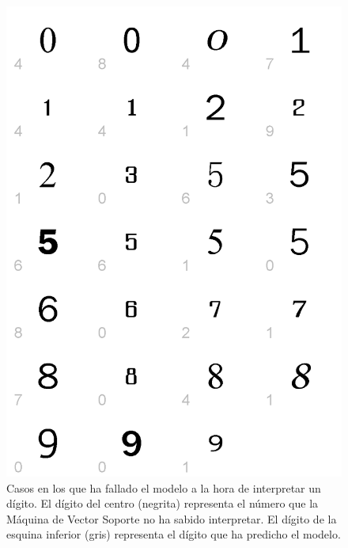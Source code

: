 \documentclass[12pt,spanish,a4paper]{article}
\numberwithin{equation}{section}
\begin{document}
\begin{figure}[h]

{\centering \includegraphics[width=0.8\linewidth]{graphics/svm/digitos_fallados_modelo_svm_linear2_paso1_a-1} 

}

\caption{Casos en los que ha fallado el modelo a la hora de interpretar un dígito. El dígito del centro (negrita) representa el número que la Máquina de Vector Soporte no ha sabido interpretar. El dígito de la esquina inferior (gris) representa el dígito que ha predicho el modelo.}\label{fig:digitos_fallados_modelo_svm_linear2_paso1_a}
\end{figure}
\end{document}
